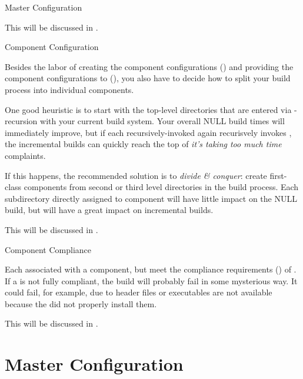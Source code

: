 \begin{description}
\item Master Configuration

  This will be discussed in .

\item Component Configuration


  Besides the labor of creating the component configurations
  () and providing the component
  configurations to \lmsbw (), you also have to
  decide how to split your build process into individual components.

  One good heuristic is to start with the top-level directories that
  are entered via \make-recursion with your current build system.  Your
  overall NULL build times will immediately improve, but if each
  recursively-invoked \makefile  again recurisvely invokes \make,
  the incremental builds can quickly reach the top of \emph{it's
    taking too much time} complaints.

  If this happens, the recommended solution is to \emph{divide \&
    conquer}: create first-class components from second or third level
  directories in the build process.  Each subdirectory directly
  assigned to component will have little impact on the NULL build, but
  will have a great impact on incremental builds.

  This will be discussed in .

\item Component \makefile Compliance

  Each \makefile associated with a component, but meet the compliance
  requirements () of \lmsbw.  If a
  \makefile is not fully compliant, the build will probably fail in
  some mysterious way.  It could fail, for example, due to header
  files or executables are not available because the \makefile did not
  properly install them.

  This will be discussed in .

\end{description}


\section{Master Configuration}\label{wrap:master-configuration}
\label{wrap:techniques}

